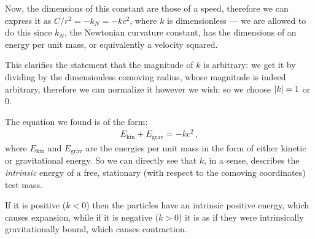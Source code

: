\documentclass[main.tex]{subfiles}
\begin{document}
Now, the dimensions of this constant are those of a speed, therefore we can express it as \(C / r^2 = -k_N = -k c^2\), where \(k\) is dimensionless --- we are allowed to do this since \(k_N\), the Newtonian curvature constant, has the dimensions of an energy per unit mass, or equivalently a velocity squared.

This clarifies the statement that the magnitude of \(k\) is arbitrary: we get it by dividing by the dimensionless comoving radius, whose magnitude is indeed arbitrary, therefore we can normalize it however we wish: so we choose \(\abs{k} = 1\) or 0.

\begin{bluebox}
The equation we found is of the form: 
%
\begin{align}
E _{\text{kin}} + E _{\text{grav}} = -k c^2
\,,
\end{align}
%
where \(E _{\text{kin}}\) and \(E _{\text{grav}}\) are the energies per unit mass in the form of either kinetic or gravitational energy.
So we can directly see that \(k\), in a sense, describes the \emph{intrinsic} energy of a free, stationary (with respect to the comoving coordinates) test mass.

If it is positive (\(k<0\)) then the particles have an intrinsic positive energy, which causes expansion, while if it is negative (\(k>0\)) it is as if they were intrinsically gravitationally bound, which causes contraction.
\end{bluebox}

\end{document}
